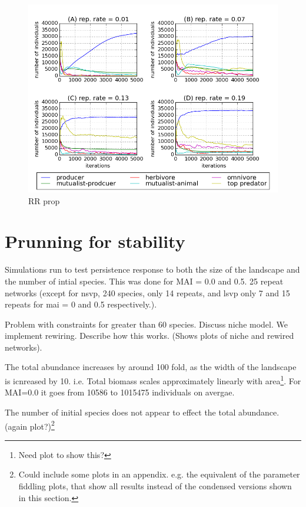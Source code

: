 \begin{figure}
	\centering
	\includegraphics[width=1.0\linewidth]{"figures/rr_mean_trophic_dynamics_mai05"}
	\caption{RR prop}
	\label{fig:rr_mean_troph_dynamics_mai05}
\end{figure}


\section{Prunning for stability}

Simulations run to test persistence response to both the size of the landscape and the number of intial species. This was done for MAI = 0.0 and 0.5. 25 repeat networks (except for nsvp, 240 species, only 14 repeats, and lsvp only 7 and 15 repeats for mai = 0 and 0.5 respectively.). 

Problem with constraints for greater than 60 species. Discuss niche model. We implement rewiring. Describe how this works. (Shows plots of niche and rewired networks).  

The total abundance increases by around 100 fold, as the width of the landscape is icnreased by 10. i.e. Total biomass scales approximately linearly with area\footnote{Need plot to show this?}. For MAI=0.0 it goes from 10586 to 1015475 individuals on avergae. 

The number of initial species does not appear to effect the total abundance. (again plot?)\footnote{Could include some plots in an appendix. e.g. the equivalent of the parameter fiddling plots, that show all results instead of the condensed versions shown in this section.}


